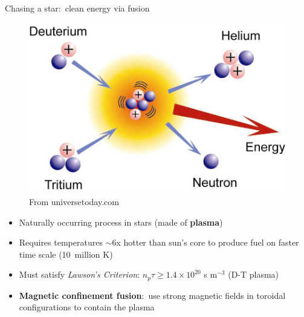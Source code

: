 \documentclass[12pt,table]{beamer}
\begin{document}
\begin{frame}{Chasing a star:~clean energy via fusion}
\begin{minipage}{\linewidth}
    \begin{minipage}{.35\linewidth}
    \begin{figure}
        \centering
        \includegraphics[width=\linewidth]{figs/fusion.jpg} \\
        \tiny From universetoday.com
    \end{figure}%
    \end{minipage}%
    \begin{minipage}{.65\linewidth}
    \begin{itemize}
        \footnotesize
        \item Naturally occurring process in stars (made of \textbf{plasma})
        \item Requires temperatures $\sim$6x hotter than sun's core to produce fuel on faster time scale (10~million K)
        \item Must satisfy \emph{Lawson's Criterion}:
        $n_p \tau \geq 1.4 \times 10^{20}$ s m$^{-3}$ (D-T plasma)
        \item \textbf{Magnetic confinement fusion}:~use strong magnetic fields in toroidal configurations to contain the plasma%
    \end{itemize}%
    \end{minipage}
\end{minipage}
    \vfill
    \begin{minipage}{.3\linewidth}
        \begin{figure}
        \centering

\end{figure}
\end{minipage}
\end{frame}
\end{document}
